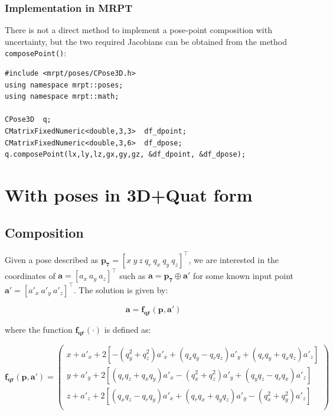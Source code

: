 \documentclass[a4paper,11pt]{report}
\begin{document}
\subsubsection{Implementation in MRPT}

There is not a direct method to implement a pose-point composition with uncertainty,
but the two required Jacobians can be obtained from the method \texttt{composePoint()}:

\begin{lstlisting}
#include <mrpt/poses/CPose3D.h>
using namespace mrpt::poses;
using namespace mrpt::math;

CPose3D  q;
CMatrixFixedNumeric<double,3,3>  df_dpoint;
CMatrixFixedNumeric<double,3,6>  df_dpose;
q.composePoint(lx,ly,lz,gx,gy,gz, &df_dpoint, &df_dpose);
\end{lstlisting}



\section{With poses in 3D+Quat form}

\subsection{Composition}

Given a pose described as $\mathbf{p_7} = [x ~ y ~ z ~  q_r ~ q_x ~ q_y ~ q_z ] ^ \top$,
we are interested in the coordinates of $\mathbf{a}=[a_x ~ a_y ~ a_z]^\top$ such as
$\mathbf{a} = \mathbf{p_7} \oplus \mathbf{a'}$ for some known input point
$\mathbf{a'} = [a'_x ~ a'_y ~ a'_z]^\top$.
The solution is given by:

\begin{equation}
\mathbf{a} = \mathbf{f_{qr}} (\mathbf{p},\mathbf{a'})
\end{equation}

\noindent where the function $\mathbf{f_{qr}}(\cdot)$ is defined as:

\begin{equation}
\mathbf{f_{qr}} (\mathbf{p},\mathbf{a'}) =
 \left(
\begin{array}{c}
 x + a'_x + 2 \left[-(q_y^2+ q_z^2) a'_x +(q_x q_y - q_r q_z) a'_y+(q_r q_y+q_x q_z) a'_z \right]  \\
 y + a'_y + 2 \left[(q_r q_z+  q_x q_y) a'_x-(q_x^2 +q_z^2) a'_y+(q_y q_z-q_r q_x) a'_z \right] \\
 z + a'_z + 2 \left[(q_x q_z-  q_r q_y) a'_x+(q_r q_x + q_y q_z) a'_y-(q_x^2+q_y^2) a'_z \right]  \\
\end{array}
\right)
\label{eq:quat_rot_point_func}
\end{equation}
\end{document}
